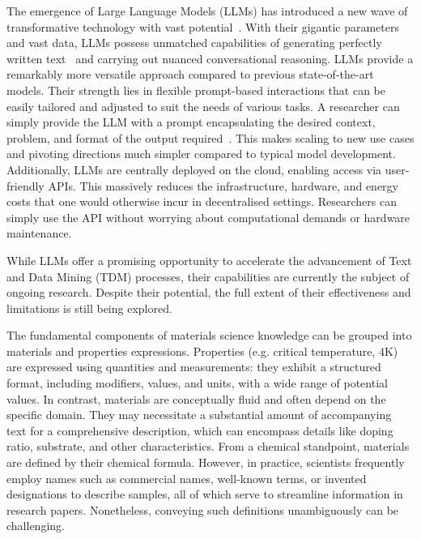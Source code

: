 The emergence of Large Language Models (LLMs) has introduced a new wave of transformative technology with vast potential~\cite{openai2023gpt4}. With their gigantic parameters and vast data, LLMs possess unmatched capabilities of generating perfectly written text~\cite{lee2020patent, dou2021gpt} and carrying out nuanced conversational reasoning.
LLMs provide a remarkably more versatile approach compared to previous state-of-the-art models. Their strength lies in flexible prompt-based interactions that can be easily tailored and adjusted to suit the needs of various tasks. A researcher can simply provide the LLM with a prompt encapsulating the desired context, problem, and format of the output required~\cite{ouyang2022training}. This makes scaling to new use cases and pivoting directions much simpler compared to typical model development.
Additionally, LLMs are centrally deployed on the cloud, enabling access via user-friendly APIs. This massively reduces the infrastructure, hardware, and energy costs that one would otherwise incur in decentralised settings. Researchers can simply use the API without worrying about computational demands or hardware maintenance.

While LLMs offer a promising opportunity to accelerate the advancement of Text and Data Mining (TDM) processes, their capabilities are currently the subject of ongoing research. Despite their potential, the full extent of their effectiveness and limitations is still being explored.


The fundamental components of materials science knowledge can be grouped into materials and properties expressions. 
Properties (e.g. critical temperature, 4K) are expressed using quantities and measurements: they exhibit a structured format, including modifiers, values, and units, with a wide range of potential values. 
In contrast, materials are conceptually fluid and often depend on the specific domain. They may necessitate a substantial amount of accompanying text for a comprehensive description, which can encompass details like doping ratio, substrate, and other characteristics. 
From a chemical standpoint, materials are defined by their chemical formula. 
However, in practice, scientists frequently employ names such as commercial names, well-known terms, or invented designations to describe samples, all of which serve to streamline information in research papers. Nonetheless, conveying such definitions unambiguously can be challenging.

